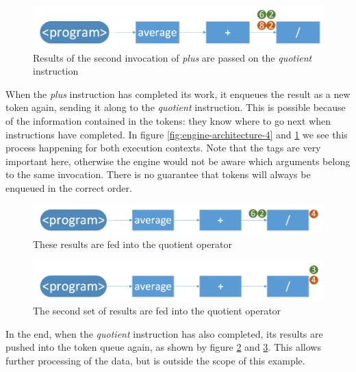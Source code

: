 \begin{figure}[h!]
	\includegraphics[width=\textwidth]{images/Engine-Architecture-5.png}
	\caption{Results of the second invocation of \textit{plus} are passed on the \textit{quotient} instruction}
	\label{fig:engine-architecture-5}
\end{figure}

When the \textit{plus} instruction has completed its work, it enqueues the result as a new token again, sending it along to the \textit{quotient} instruction. This is possible because of the information contained in the tokens: they know where to go next when instructions have completed. 
In figure \ref{fig:engine-architecture-4} and \ref{fig:engine-architecture-5} we see this process happening for both execution contexts.
Note that the tags are very important here, otherwise the engine would not be aware which arguments belong to the same invocation. There is no guarantee that tokens will always be enqueued in the correct order.

\begin{figure}[h!]
	\includegraphics[width=\textwidth]{images/Engine-Architecture-6.png}
	\caption{These results are fed into the quotient operator}
	\label{fig:engine-architecture-6}
\end{figure}

\begin{figure}[h!]
	\includegraphics[width=\textwidth]{images/Engine-Architecture-7.png}
	\caption{The second set of results are fed into the quotient operator}
	\label{fig:engine-architecture-7}
\end{figure}

In the end, when the \textit{quotient} instruction has also completed, its results are pushed into the token queue again, as shown by figure \ref{fig:engine-architecture-6} and \ref{fig:engine-architecture-7}. This allows further processing of the data, but is outside the scope of this example. 

